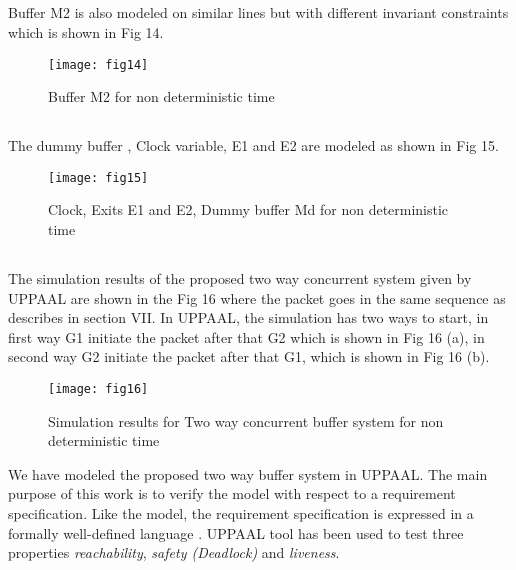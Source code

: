 \documentclass[letterpaper]{article}
\begin{document}
\subsection{} Buffer M2 is also modeled on similar lines but with different invariant constraints which is shown in Fig 14.

\begin{figure}[bpht!]
\centering
	\texttt{[image: fig14]}
		\caption{Buffer M2 for non deterministic time}
	\label{Fig14}
	\end{figure}
	
\subsection{} The dummy buffer  , Clock variable, E1 and E2 are modeled as shown in Fig 15.

\begin{figure}[bpht!]
\centering
	\texttt{[image: fig15]}
		\caption{Clock, Exits E1 and E2, Dummy buffer Md for non deterministic time}
	\label{Fig15}
\end{figure}

\subsection{} The simulation results of the proposed two way concurrent system given by UPPAAL are shown in the Fig 16 where the packet goes in the same sequence as describes in section VII. In UPPAAL, the simulation has two ways to start, in first way G1 initiate the packet after that G2 which is shown in Fig 16 (a), in second way G2 initiate the packet after that G1, which is shown in Fig 16 (b).
\begin{figure}[bpht!]
\centering
	\texttt{[image: fig16]}
		\caption{Simulation results for Two way concurrent buffer system for non deterministic time}
	\label{Fig16}
\end{figure}



We have modeled the proposed two way buffer system in UPPAAL. The main purpose of this work is to verify the model with respect to a requirement specification. Like the model, the requirement specification is expressed in a formally well-defined language \cite{MHMR04}. UPPAAL tool has been used to test three properties \textit{reachability}, \textit{safety (Deadlock)} and \textit{liveness}. 
\end{document}

